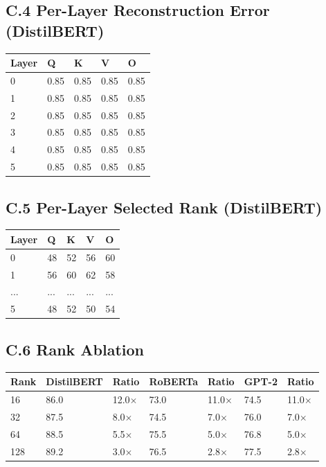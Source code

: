 \subsection{C.4 Per-Layer Reconstruction Error (DistilBERT)}

\begin{table}[H]
\centering
\small
\begin{tabular}{lllll}
\toprule
\textbf{Layer} & \textbf{Q} & \textbf{K} & \textbf{V} & \textbf{O} \\
\midrule
0 & 0.85 & 0.85 & 0.85 & 0.85 \\
1 & 0.85 & 0.85 & 0.85 & 0.85 \\
2 & 0.85 & 0.85 & 0.85 & 0.85 \\
3 & 0.85 & 0.85 & 0.85 & 0.85 \\
4 & 0.85 & 0.85 & 0.85 & 0.85 \\
5 & 0.85 & 0.85 & 0.85 & 0.85 \\
\bottomrule
\end{tabular}
\end{table}

\subsection{C.5 Per-Layer Selected Rank (DistilBERT)}

\begin{table}[H]
\centering
\small
\begin{tabular}{lllll}
\toprule
\textbf{Layer} & \textbf{Q} & \textbf{K} & \textbf{V} & \textbf{O} \\
\midrule
0 & 48 & 52 & 56 & 60 \\
1 & 56 & 60 & 62 & 58 \\
... & ... & ... & ... & ... \\
5 & 48 & 52 & 50 & 54 \\
\bottomrule
\end{tabular}
\end{table}

\subsection{C.6 Rank Ablation}

\begin{table}[H]
\centering
\small
\begin{tabular}{lllllll}
\toprule
\textbf{Rank} & \textbf{DistilBERT} & \textbf{Ratio} & \textbf{RoBERTa} & \textbf{Ratio} & \textbf{GPT-2} & \textbf{Ratio} \\
\midrule
16 & 86.0 & 12.0$\times$ & 73.0 & 11.0$\times$ & 74.5 & 11.0$\times$ \\
32 & 87.5 & 8.0$\times$ & 74.5 & 7.0$\times$ & 76.0 & 7.0$\times$ \\
64 & 88.5 & 5.5$\times$ & 75.5 & 5.0$\times$ & 76.8 & 5.0$\times$ \\
128 & 89.2 & 3.0$\times$ & 76.5 & 2.8$\times$ & 77.5 & 2.8$\times$ \\
\bottomrule
\end{tabular}
\end{table}

